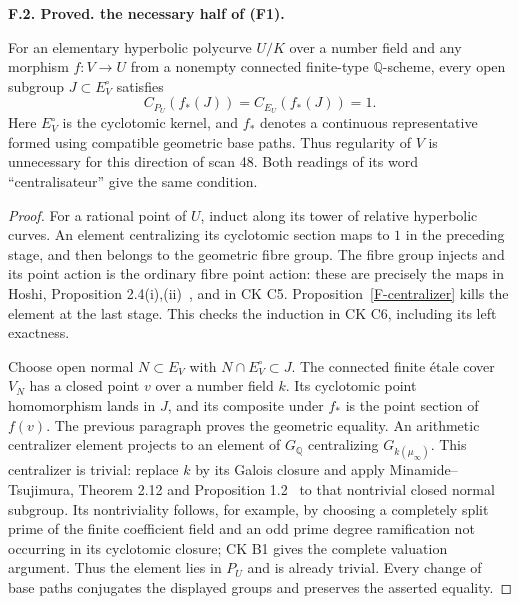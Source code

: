 \documentclass[11pt,oneside]{article}
\makeatletter
\newcounter{statementanchor}
\newenvironment{statement}[3]{%
 \refstepcounter{statementanchor}\def\@currentlabel{#1}%
 \par\addvspace{9pt}\noindent
 \textbf{#1. #2. #3.}\par\nobreak\noindent\ignorespaces
}{\par\addvspace{5pt}}
\makeatother
\begin{document}
\begin{statement}{F.2}{Proved}{the necessary half of (F1)}
\label{st:F.2}
\label{F-geometric-necessary}
For an elementary hyperbolic polycurve $U/K$ over a number field and
any morphism $f:V\to U$ from a nonempty connected finite-type
$\mathbb Q$-scheme, every open subgroup $J\subset E_V^{\circ}$
satisfies
\[
 C_{P_U}(f_*(J))=C_{E_U}(f_*(J))=1.
\]
Here $E_V^{\circ}$ is the cyclotomic kernel, and $f_*$ denotes a
continuous representative formed using compatible geometric base
paths. Thus regularity of $V$ is unnecessary for this direction of
scan 48. Both readings of its word ``centralisateur'' give the same
condition.
\end{statement}
\begin{proof}
For a rational point of $U$, induct along its tower of relative
hyperbolic curves. An element centralizing its cyclotomic section
maps to $1$ in the preceding stage, and then belongs to the
geometric fibre group. The fibre group injects and its point action
is the ordinary fibre point action: these are precisely the maps
in Hoshi, Proposition 2.4(i),(ii)~\cite{F-HoshiPoly}, and in CK C5.
Proposition~\ref{F-centralizer} kills the element at the last stage.
This checks the induction in CK C6, including its left exactness.

Choose open normal $N\subset E_V$ with $N\cap E_V^{\circ}\subset J$.
The connected finite \'etale cover $V_N$ has a closed point $v$ over
a number field $k$. Its cyclotomic point homomorphism lands in $J$,
and its composite under $f_*$ is the point section of $f(v)$. The
previous paragraph proves the geometric equality. An arithmetic
centralizer element projects to an element of $G_{\mathbb Q}$
centralizing $G_{k(\mu_\infty)}$. This centralizer is trivial:
replace $k$ by its Galois closure and apply Minamide--Tsujimura,
Theorem 2.12 and Proposition 1.2~\cite{F-MinamideTsujimura} to that
nontrivial closed normal subgroup. Its nontriviality follows, for
example, by choosing a completely split prime of the finite
coefficient field and an odd prime degree ramification not occurring
in its cyclotomic closure; CK B1 gives the complete valuation
argument. Thus the element lies in $P_U$ and is already trivial.
Every change of base paths conjugates the displayed groups and
preserves the asserted equality.
\end{proof}
\end{document}
